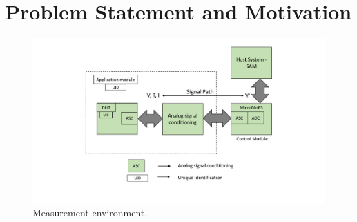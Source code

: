 \section{Problem Statement and Motivation}

\begin{figure}[htb]
	\centering
	\includegraphics[trim=145 50 0 25, clip, width=\textwidth]{images/High-level signal conditioning.pdf}
	\caption{Measurement environment.}
	\label{fig:Signalmodelmotivation}
\end{figure} 

